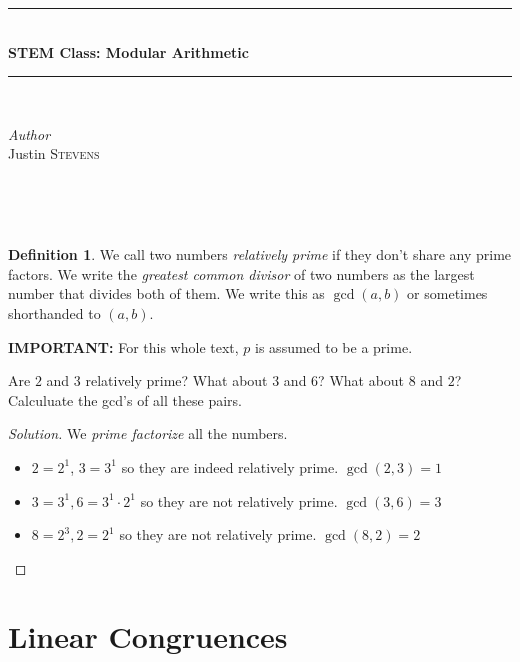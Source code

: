 \documentclass[12pt,openany]{book}
\theoremstyle{definition}
\newtheorem{defi}{Definition}[section]
\newenvironment{soln}{\begin{proof}[Solution]}{\end{proof}}
\theoremstyle{definition}
\newcommand{\HRule}{\rule{\linewidth}{0.5mm}} %
\begin{document}
\begin{center}
\HRule \\[0.4cm]
{ \huge \bfseries STEM Class:  Modular Arithmetic}\\[0.4cm] %
\HRule \\[1.5cm]
\begin{minipage}{0.4\textwidth}
\begin{flushleft} \large
\emph{Author}\\
Justin \textsc{Stevens} \newline
\end{flushleft}
\end{minipage}
~
\begin{minipage}{0.4\textwidth}
\begin{flushright} \large

\end{flushright}
\end{minipage}\\[0.5cm]
\end{center}
\setcounter{chapter}{1}

\begin{defi}  We call two numbers \textit{relatively prime} if they don't share any prime factors.  We write the \textit{greatest common divisor} of two numbers as the largest number that divides both of them.  We write this as $\gcd(a,b)$ or sometimes shorthanded to $(a,b)$.    \end{defi}

\textbf{IMPORTANT:}  For this whole text, $p$ is assumed to be a prime.  

\begin{exmp}  Are $2$ and $3$ relatively prime?  What about $3$ and $6$?  What about $8$ and $2$?  Calculuate the gcd's of all these pairs. \end{exmp}
\begin{soln}  We \textit{prime factorize} all the numbers.
\begin{itemize}
\item $2=2^1$, $3=3^1$ so they are indeed relatively prime.  $\gcd(2,3)=1$
\item  $3=3^1, 6=3^1\cdot 2^1$ so they are not relatively prime.  $\gcd(3,6)=3$
\item  $8=2^3, 2=2^1$ so they are not relatively prime. $\gcd(8,2)=2$ \end{itemize}  
\end{soln}
\section{Linear Congruences}
\end{document}

